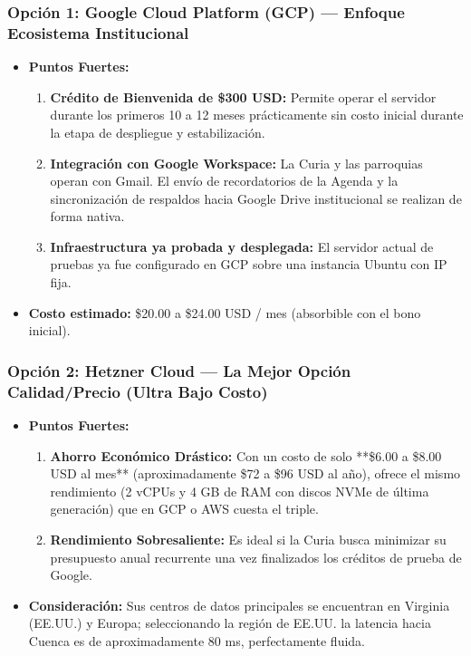 \documentclass[11pt,a4paper]{article}
\begin{document}
\subsubsection{Opción 1: Google Cloud Platform (GCP) --- Enfoque Ecosistema Institucional}
\begin{itemize}[leftmargin=1cm]
    \item \textbf{Puntos Fuertes:}
    \begin{enumerate}
        \item \textbf{Crédito de Bienvenida de \$300 USD:} Permite operar el servidor durante los primeros 10 a 12 meses prácticamente sin costo inicial durante la etapa de despliegue y estabilización.
        \item \textbf{Integración con Google Workspace:} La Curia y las parroquias operan con Gmail. El envío de recordatorios de la Agenda y la sincronización de respaldos hacia Google Drive institucional se realizan de forma nativa.
        \item \textbf{Infraestructura ya probada y desplegada:} El servidor actual de pruebas ya fue configurado en GCP sobre una instancia Ubuntu con IP fija.
    \end{enumerate}
    \item \textbf{Costo estimado:} \$20.00 a \$24.00 USD / mes (absorbible con el bono inicial).
\end{itemize}

\subsubsection{Opción 2: Hetzner Cloud --- La Mejor Opción Calidad/Precio (Ultra Bajo Costo)}
\begin{itemize}[leftmargin=1cm]
    \item \textbf{Puntos Fuertes:}
    \begin{enumerate}
        \item \textbf{Ahorro Económico Drástico:} Con un costo de solo **\$6.00 a \$8.00 USD al mes** (aproximadamente \$72 a \$96 USD al año), ofrece el mismo rendimiento (2 vCPUs y 4 GB de RAM con discos NVMe de última generación) que en GCP o AWS cuesta el triple.
        \item \textbf{Rendimiento Sobresaliente:} Es ideal si la Curia busca minimizar su presupuesto anual recurrente una vez finalizados los créditos de prueba de Google.
    \end{enumerate}
    \item \textbf{Consideración:} Sus centros de datos principales se encuentran en Virginia (EE.UU.) y Europa; seleccionando la región de EE.UU. la latencia hacia Cuenca es de aproximadamente 80 ms, perfectamente fluida.
\end{itemize}
\end{document}
